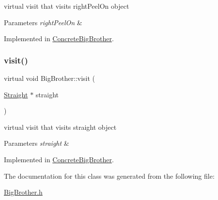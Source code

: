 virtual visit that visits right\+Peel\+On object 
\begin{DoxyParams}{Parameters}
{\em right\+Peel\+On} & \\
\hline
\end{DoxyParams}


Implemented in \mbox{\hyperlink{class_concrete_big_brother_aca0d91bd7605b59f9aaa2baf9763ceb3}{Concrete\+Big\+Brother}}.

\mbox{\label{class_big_brother_a16c919a7c2d90a111eb122210923bff2}} 
\subsubsection{\texorpdfstring{visit()}{visit()}\hspace{0.1cm}{\footnotesize\ttfamily [7/7]}}
{\footnotesize\ttfamily virtual void Big\+Brother\+::visit (\begin{DoxyParamCaption}\item[{\mbox{\hyperlink{class_straight}{Straight}} $\ast$}]{straight }\end{DoxyParamCaption})\hspace{0.3cm}{\ttfamily [pure virtual]}}

virtual visit that visits straight object 
\begin{DoxyParams}{Parameters}
{\em straight} & \\
\hline
\end{DoxyParams}


Implemented in \mbox{\hyperlink{class_concrete_big_brother_a056169cb0e91f4ace1229d7caa2ee5d2}{Concrete\+Big\+Brother}}.



The documentation for this class was generated from the following file\+:\begin{DoxyCompactItemize}
\item 
\mbox{\hyperlink{_big_brother_8h}{Big\+Brother.\+h}}\end{DoxyCompactItemize}

